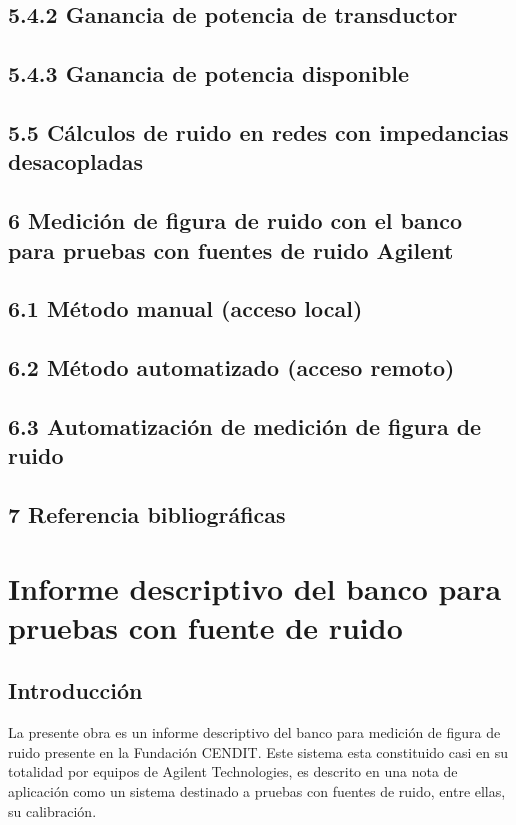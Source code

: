 \documentclass[paper=letter,oneside,fontsize=10pt,parskip=full]{article}
\begin{document}
\subsection{5.4.2 Ganancia de potencia de transductor}
\subsection{5.4.3 Ganancia de potencia disponible}
\subsection{5.5 Cálculos de ruido en redes con impedancias desacopladas}
\subsection{}
\subsection{6 Medición de figura de ruido con el banco para pruebas con fuentes de ruido Agilent}
\subsection{6.1 Método manual (acceso local)}
\subsection{6.2 Método automatizado (acceso remoto)}
\subsection{6.3 Automatización de medición de figura de ruido}
\subsection{}
\subsection{7 Referencia bibliográficas}
\section{}
\clearpage\section{Informe descriptivo del banco para pruebas con fuente de ruido}
\subsection{Introducción}
La presente obra es un informe descriptivo del banco para medición de figura de ruido presente en la Fundación CENDIT.
Este sistema esta constituido casi en su totalidad por equipos de Agilent Technologies, es descrito en una nota de
aplicación como un sistema destinado a pruebas con fuentes de ruido, entre ellas, su calibración.
\end{document}
